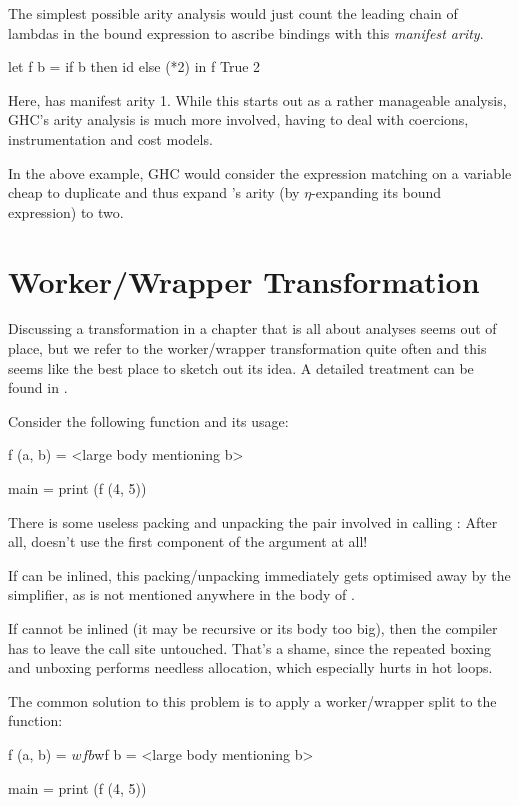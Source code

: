The simplest possible arity analysis would just count the leading chain of lambdas in the bound expression to ascribe bindings with this \emph{manifest arity}.
\begin{haskellcode}
  let f b = 
        if b
        then id 
        else (*2)
  in f True 2
\end{haskellcode}

Here,  has manifest arity 1.
While this starts out as a rather manageable analysis, GHC's arity analysis is much more involved, having to deal with coercions, instrumentation and cost models.

In the above example, GHC would consider the  expression matching on a variable cheap to duplicate and thus expand 's arity (by $\eta$-expanding its bound expression) to two.

\section{Worker/Wrapper Transformation}\label{sec:ww}

Discussing a transformation in a chapter that is all about analyses seems out of place, but we refer to the worker/wrapper transformation quite often and this seems like the best place to sketch out its idea.
A detailed treatment can be found in \textcite{ww}.

Consider the following function and its usage:
\begin{haskellcode}
  f (a, b) = 
    <large body mentioning b>

  main = print (f (4, 5))
\end{haskellcode}

There is some useless packing and unpacking the pair involved in calling :
After all,  doesn't use the first component of the argument at all!

If  can be inlined, this packing/unpacking immediately gets optimised away by the simplifier, as  is not mentioned anywhere in the body of .

If  cannot be inlined (it may be recursive or its body too big), then the compiler has to leave the call site untouched.
That's a shame, since the repeated boxing and unboxing performs needless allocation, which especially hurts in hot loops.

The common solution to this problem is to apply a worker/wrapper split to the function:
\begin{haskellcode}
  f (a, b) = 
    $wf b

  $wf b =
    <large body mentioning b>

  main = print (f (4, 5))
\end{haskellcode}

